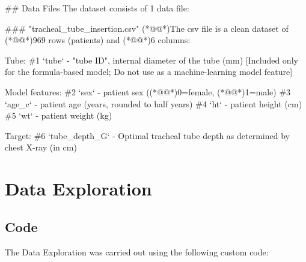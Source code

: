 \documentclass[11pt]{article}
\begin{document}
\begin{codeoutput}
\#\# Data Files
The dataset consists of 1 data file:

\#\#\# "tracheal\_tube\_insertion.csv"
(*@@*)The csv file is a clean dataset of (*@@*)969 rows (patients) and (*@@*)6 columns:

Tube:
\#1 `tube` - "tube ID", internal diameter of the tube (mm) [Included only for the formula-based model; Do not use as a machine-learning model feature]

Model features:
\#2 `sex` - patient sex ((*@@*)0=female, (*@@*)1=male)
\#3 `age\_c` - patient age (years, rounded to half years)
\#4 `ht` - patient height (cm)
\#5 `wt` - patient weight (kg)

Target:
\#6 `tube\_depth\_G` - Optimal tracheal tube depth as determined by chest X-ray (in cm)



\end{codeoutput}

\section{Data Exploration}
\subsection{{Code}}
The Data Exploration was carried out using the following custom code:
\end{document}
